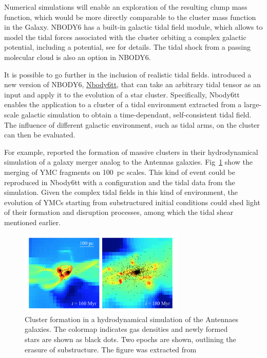 Numerical simulations will enable an exploration of the resulting clump mass function, which would be more directly comparable to the cluster mass function in the Galaxy. NBODY6 has a built-in galactic tidal field module, which allows to model the tidal forces associated with the cluster orbiting a complex galactic potential, including a \cite{Miyamoto1975} potential, see \cite{Aarseth2003} for details. The tidal shock from a passing molecular cloud is also an option in NBODY6.

It is possible to go further in the inclusion of realistic tidal fields. \cite{Renaud2011} introduced a new version of NBODY6, \href{http://personal.ph.surrey.ac.uk/~fr0005/nbody6tt.php}{Nbody6tt}, that can take an arbitrary tidal tensor as an input and apply it to the evolution of a star cluster. Specifically, Nbody6tt enables the application to a cluster of a tidal environment extracted from a large-scale galactic simulation to obtain a time-dependant, self-consistent tidal field. The influence of different galactic environment, such as tidal arms, on the cluster can then be evaluated. 

For example, \cite{Renaud2015b} reported the formation of massive clusters in their hydrodynamical simulation of a galaxy merger analog to the Antennas galaxies. Fig~\ref{Fig:7_renaud} show the merging of YMC fragments on 100~pc scales. This kind of event could be reproduced in Nbody6tt with a \HubLem configuration and the tidal data from the simulation. Given the complex tidal fields in this kind of environment, the evolution of YMCs starting from substructured initial conditions could shed light of their formation and disruption processes, among which the tidal shear mentioned earlier.


\begin{figure}
\begin{center}
\includegraphics[width=0.7\textwidth]{Figures/7_renaudantennas.png}
\end{center}
\caption[Cluster formation in a hydrodynamical simulation of the Antennaes galaxies]{Cluster formation in a hydrodynamical simulation of the Antennaes galaxies. The colormap indicates gas densities and newly formed stars are shown as black dots. Two epochs are shown, outlining the erasure of substructure. The figure was extracted from \cite{Renaud2015b} }
\label{Fig:7_renaud}
\end{figure} 



